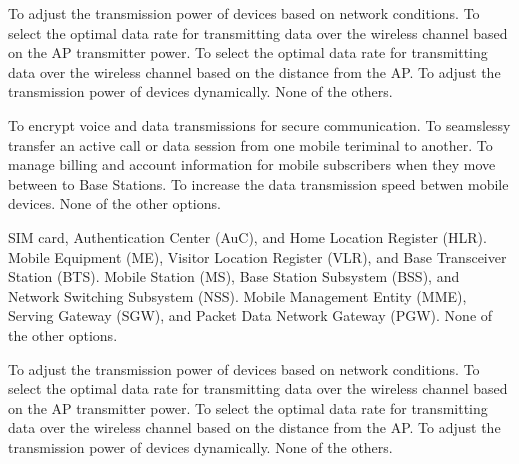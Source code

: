 \begin{questions}

    \begin{checkboxes}
        \choice To adjust the transmission power of devices based on network conditions.
        \choice To select the optimal data rate for transmitting data over the wireless channel based on the AP transmitter power.
        \choice To select the optimal data rate for transmitting data over the wireless channel based on the distance from the AP.
        \choice To adjust the transmission power of devices dynamically.
        \CorrectChoice None of the others.
    \end{checkboxes}

    \begin{checkboxes}
        \choice To encrypt voice and data transmissions for secure communication.
        \choice To seamslessy transfer an active call or data session from one mobile teriminal to another.
        \choice To manage billing and account information for mobile subscribers when they move between to Base Stations.
        \choice To increase the data transmission speed betwen mobile devices.
        \CorrectChoice None of the other options.
    \end{checkboxes}

    \begin{checkboxes}
        \CorrectChoice SIM card, Authentication Center (AuC), and Home Location Register (HLR).
        \choice Mobile Equipment (ME), Visitor Location Register (VLR), and Base Transceiver Station (BTS).
        \choice Mobile Station (MS), Base Station Subsystem (BSS), and Network Switching Subsystem (NSS).
        \choice Mobile Management Entity (MME), Serving Gateway (SGW), and Packet Data Network Gateway (PGW).
        \choice None of the other options.
    \end{checkboxes}

    \begin{checkboxes}
        \choice To adjust the transmission power of devices based on network conditions.
        \choice To select the optimal data rate for transmitting data over the wireless channel based on the AP transmitter power.
        \choice To select the optimal data rate for transmitting data over the wireless channel based on the distance from the AP.
        \choice To adjust the transmission power of devices dynamically.
        \CorrectChoice None of the others.
    \end{checkboxes}


\end{questions}
